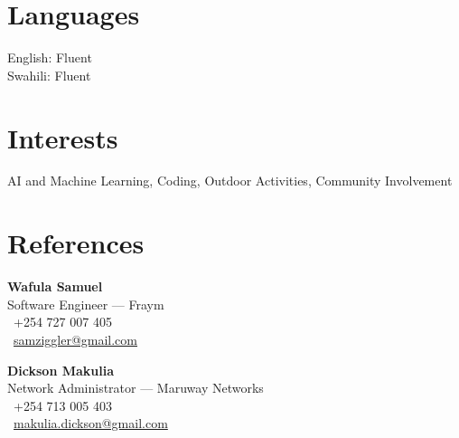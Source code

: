 \documentclass[a4paper,10pt]{article}
\begin{document}
\section*{Languages}
English: Fluent \\
Swahili: Fluent

\section*{Interests}
AI and Machine Learning, Coding, Outdoor Activities, Community Involvement

\section*{References}

\textbf{Wafula Samuel} \\
Software Engineer — Fraym \\
\faPhone\ +254 727 007 405 \\
\faEnvelope\ \href{mailto:samziggler@gmail.com}{samziggler@gmail.com}

\vspace{0.5em}

\textbf{Dickson Makulia} \\
Network Administrator — Maruway Networks \\
\faPhone\ +254 713 005 403 \\
\faEnvelope\ \href{mailto:makulia.dickson@gmail.com}{makulia.dickson@gmail.com}
\end{document}
